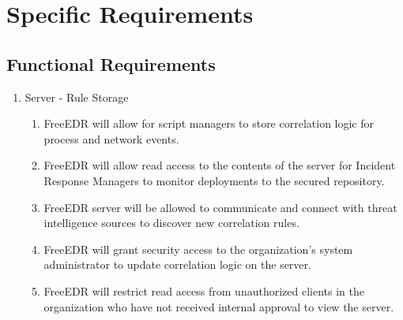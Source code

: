 \documentclass{scrreprt}
\begin{document}
\chapter{Specific Requirements}

\section{Functional Requirements}

\begin{enumerate}[label*=R\arabic*.]
    \item Server - Rule Storage
    \begin{enumerate}[label*=\arabic*.]
          \item FreeEDR will allow for script managers to store correlation logic for process and network events.
	\item FreeEDR will allow read access to the contents of the server for Incident Response Managers to monitor deployments to the secured repository.
	\item FreeEDR server will be allowed to communicate and connect with threat intelligence sources to discover new correlation rules.
	\item FreeEDR will grant security access to the organization’s system administrator to update correlation logic on the server.
	\item FreeEDR will restrict read access from unauthorized clients in the organization who have not received internal approval to view the server. 
    \end{enumerate} 
\end{enumerate}
\end{document}
